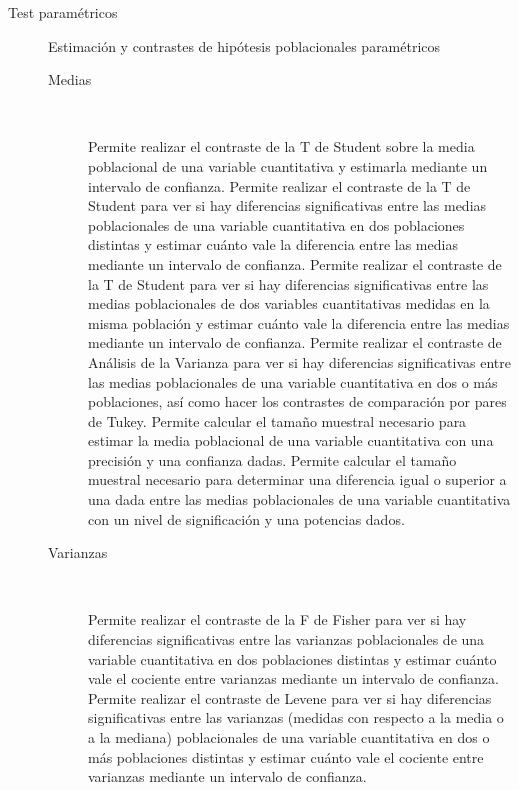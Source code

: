 \documentclass[10pt,twoside,spanish]{article}
\numberwithin{equation}{section}
\begin{document}
\begin{description}
\item[Test paramétricos] Estimación y contrastes de hipótesis poblacionales paramétricos 
\begin{description}
\item[Medias]\mbox{}\\[-1\baselineskip]
\begin{itemize}
 Permite realizar el contraste de la T de Student sobre la media poblacional de una variable cuantitativa y
estimarla mediante un intervalo de confianza. 
 Permite realizar el contraste de la T de Student para ver si hay diferencias significativas
entre las medias poblacionales de una variable cuantitativa en dos poblaciones distintas y estimar cuánto vale la diferencia entre las medias mediante un
intervalo de confianza. 
 Permite realizar el contraste de la T de Student para ver si hay diferencias significativas entre
las medias poblacionales de dos variables cuantitativas medidas en la misma población y estimar cuánto vale la diferencia entre las medias mediante un
intervalo de confianza. 
 Permite realizar el contraste de Análisis de la Varianza para ver si hay diferencias significativas entre las medias
poblacionales de una variable cuantitativa en dos o más poblaciones, así como hacer los contrastes de comparación por pares de Tukey. 
 Permite calcular el tamaño muestral necesario para estimar la media poblacional de una
variable cuantitativa con una precisión y una confianza dadas. 
 Permite calcular el tamaño muestral necesario para determinar una diferencia igual o
superior a una dada entre las medias poblacionales de una variable cuantitativa con un nivel de significación y una potencias dados. 
\end{itemize}

\item[Varianzas]\hfill\\[-1\baselineskip]
\begin{itemize}
 Permite realizar el contraste de la F de Fisher para ver si hay diferencias significativas entre las varianzas
poblacionales de una variable cuantitativa en dos poblaciones distintas y estimar cuánto vale el cociente entre varianzas mediante un intervalo de confianza.  
 Permite realizar el contraste de Levene para ver si hay diferencias significativas entre las varianzas (medidas con
respecto a la media o a la mediana) poblacionales de una variable cuantitativa en dos o más poblaciones distintas y estimar cuánto vale el cociente
entre varianzas mediante un intervalo de confianza.
\end{itemize}


\end{description}
\end{description}
\end{document}
